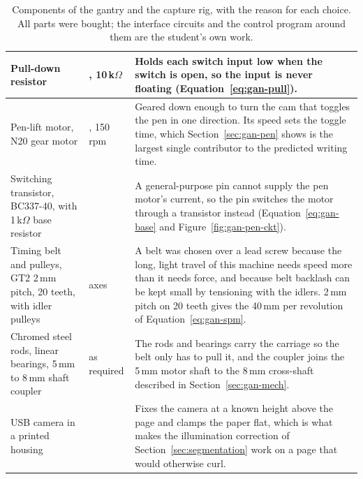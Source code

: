 \begin{table}[!htbp]
\begin{tabularx}{\linewidth}{|>{\raggedright\arraybackslash}p{3.5cm}|>{\raggedright\arraybackslash}p{2.6cm}|>{\raggedright\arraybackslash}X|}
\hline
Pull-down resistor & 4, 10\,k$\Omega$ & Holds each switch input low when the switch is open, so the input is never floating (Equation~\ref{eq:gan-pull}). \\
\hline
Pen-lift motor, N20 gear motor & 1, 150\,rpm & Geared down enough to turn the cam that toggles the pen in one direction. Its speed sets the toggle time, which Section~\ref{sec:gan-pen} shows is the largest single contributor to the predicted writing time. \\
\hline
Switching transistor, BC337-40, with 1\,k$\Omega$ base resistor & 1 & A general-purpose pin cannot supply the pen motor's current, so the pin switches the motor through a transistor instead (Equation~\ref{eq:gan-base} and Figure~\ref{fig:gan-pen-ckt}). \\
\hline
Timing belt and pulleys, GT2 2\,mm pitch, 20 teeth, with idler pulleys & 2 axes & A belt was chosen over a lead screw because the long, light travel of this machine needs speed more than it needs force, and because belt backlash can be kept small by tensioning with the idlers. 2\,mm pitch on 20 teeth gives the 40\,mm per revolution of Equation~\ref{eq:gan-spm}. \\
\hline
Chromed steel rods, linear bearings, 5\,mm to 8\,mm shaft coupler & as required & The rods and bearings carry the carriage so the belt only has to pull it, and the coupler joins the 5\,mm motor shaft to the 8\,mm cross-shaft described in Section~\ref{sec:gan-mech}. \\
\hline
USB camera in a printed housing & 1 & Fixes the camera at a known height above the page and clamps the paper flat, which is what makes the illumination correction of Section~\ref{sec:segmentation} work on a page that would otherwise curl. \\
\hline
\end{tabularx}
\caption{Components of the gantry and the capture rig, with the reason for each choice. All parts were bought; the interface circuits and the control program around them are the student's own work.}
\label{tab:gan-bom}
\end{table}


